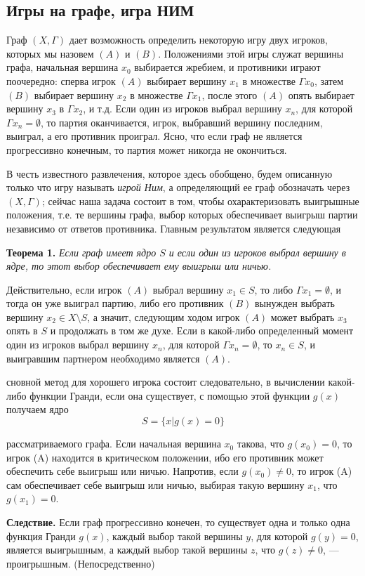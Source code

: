 \subsection{Игры на графе, игра НИМ}

Граф $(X, \Gamma)$ дает возможность определить некоторую игру двух игроков, которых мы назовем $(A)$ и $(B)$. Положениями этой игры служат вершины графа, начальная вершина $x_0$ выбирается жребием, и противники играют поочередно: сперва игрок $(A)$ выбирает вершину $x_1$ в множестве $\Gamma x_0$, затем $(B)$ выбирает вершину $x_2$ в множестве $\Gamma x_1$, после этого $(A)$ опять выбирает вершину $x_3$ в $\Gamma x_2$, и т.д. Если один из игроков выбрал вершину $x_n$, для которой $\Gamma x_n = \emptyset$, то партия оканчивается, игрок, выбравший вершину последним, выиграл, а его противник проиграл. Ясно, что если граф не является прогрессивно конечным, то партия может никогда не окончиться.

В честь известного развлечения, которое здесь обобщено, будем описанную только что игру называть \textit{игрой Ним}, а определяющий ее граф обозначать через $(X, \Gamma)$; сейчас наша задача состоит в том, чтобы охарактеризовать выигрышные положения, т.е. те вершины графа, выбор которых обеспечивает выигрыш партии независимо от ответов противника. Главным результатом является следующая

\textbf{Теорема 1.} \textit{Если граф имеет ядро $S$ и если один из игроков выбрал вершину в ядре, то этот выбор обеспечивает ему выигрыш или ничью.}

Действительно, если игрок $(A)$ выбрал вершину $x_1 \in S$, то либо $\Gamma x_1 = \emptyset$, и тогда он уже выиграл партию, либо его противник $(B)$ вынужден выбрать вершину $x_2 \in X \setminus S$, а значит, следующим ходом игрок $(A)$ может выбрать $x_3$ опять в $S$ и продолжать в том же духе. Если в какой-либо определенный момент один из игроков выбрал вершину $x_n$, для которой $\Gamma x_n = \emptyset$, то $x_n \in S$, и выигравшим партнером необходимо является $(A)$.

сновной метод для хорошего игрока состоит следовательно, в вычислении какой-либо функции Гранди, если она существует, с помощью этой функции \( g(x) \) получаем ядро
\[
S = \{ x | g(x) = 0 \}
\]

рассматриваемого графа. Если начальная вершина \( x_0 \) такова, что \( g(x_0) = 0 \), то игрок (A) находится в критическом положении, ибо его противник может обеспечить себе выигрыш или ничью. Напротив, если \( g(x_0) \neq 0 \), то игрок (A) сам обеспечивает себе выигрыш или ничью, выбирая такую вершину \( x_1 \), что \( g(x_1) = 0 \).

\textbf{Следствие.} Если граф прогрессивно конечен, то существует одна и только одна функция Гранди \( g(x) \), каждый выбор такой вершины \( y \), для которой \( g(y) = 0 \), является выигрышным, а каждый выбор такой вершины \( z \), что \( g(z) \neq 0 \), — проигрышным. (Непосредственно)

